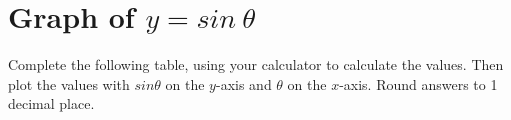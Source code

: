 \section{ Graph of $y=sin~\theta $}
\nopagebreak
\label{m39414*uid0983}Complete the following table, using your calculator to calculate the values. Then plot the values with $sin\theta $ on the $y$-axis and $\theta $ on the $x$-axis. Round answers to 1 decimal place.\par 
\setlength\mytablespace{16\tabcolsep}
\addtolength\mytablespace{9\arrayrulewidth}
\setlength\mytablewidth{\linewidth}
\setlength\mytableroom{\mytablewidth}
\addtolength\mytableroom{-\mytablespace}
\setlength\myfixedwidth{0pt}
\setlength\mystarwidth{\mytableroom}
\addtolength\mystarwidth{-\myfixedwidth}
\divide{}
